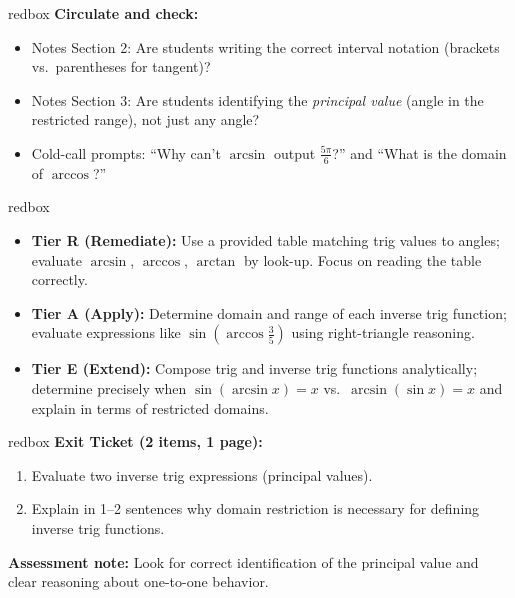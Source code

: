 \documentclass[10pt]{article}
\begin{document}
\begin{skillbox}{redbox}
\textbf{Circulate and check:}
\begin{itemize}[leftmargin=1.4em, itemsep=2pt]
    \item Notes Section 2: Are students writing the correct interval notation
          (brackets vs.\ parentheses for tangent)?
    \item Notes Section 3: Are students identifying the \emph{principal value}
          (angle in the restricted range), not just any angle?
    \item Cold-call prompts: ``Why can't $\arcsin$ output $\tfrac{5\pi}{6}$?''
          and ``What is the domain of $\arccos$?''
\end{itemize}
\end{skillbox}

\begin{skillbox}{redbox}
\begin{itemize}[leftmargin=1.4em, itemsep=2pt]
    \item \textbf{Tier R (Remediate):} Use a provided table matching trig
          values to angles; evaluate $\arcsin$, $\arccos$, $\arctan$ by
          look-up.  Focus on reading the table correctly.
    \item \textbf{Tier A (Apply):} Determine domain and range of each inverse
          trig function; evaluate expressions like $\sin(\arccos\tfrac{3}{5})$
          using right-triangle reasoning.
    \item \textbf{Tier E (Extend):} Compose trig and inverse trig functions
          analytically; determine precisely when $\sin(\arcsin x) = x$ vs.\
          $\arcsin(\sin x) = x$ and explain in terms of restricted domains.
\end{itemize}
\end{skillbox}

\begin{skillbox}[Individual Work \& Assessment]{redbox}
\textbf{Exit Ticket (2 items, 1 page):}
\begin{enumerate}[leftmargin=1.6em, itemsep=2pt]
    \item Evaluate two inverse trig expressions (principal values).
    \item Explain in 1--2 sentences why domain restriction is necessary for
          defining inverse trig functions.
\end{enumerate}
\textbf{Assessment note:} Look for correct identification of the principal
value and clear reasoning about one-to-one behavior.
\end{skillbox}
\end{document}
